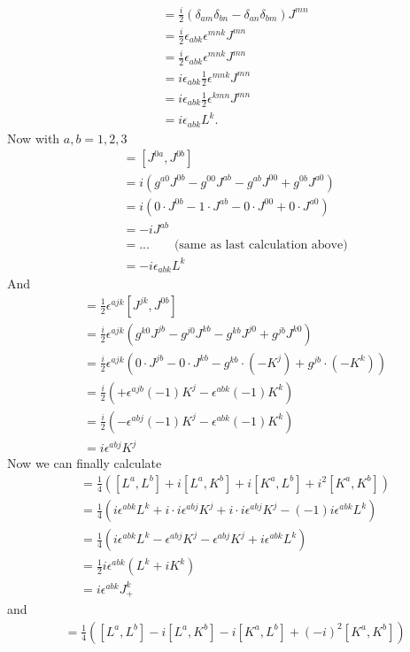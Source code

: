 \documentclass[../main.tex]{subfiles}
\begin{document}
\begin{enumerate}[(a)]
\begin{align}
&=\frac{i}{2}(\delta_{am}\delta_{bn}-\delta_{an}\delta_{bm})J^{mn}\\
&=\frac{i}{2}\epsilon_{abk}\epsilon^{mnk}J^{mn}\\
&=\frac{i}{2}\epsilon_{abk}\epsilon^{mnk}J^{mn}\\
&=i\epsilon_{abk}\frac{1}{2}\epsilon^{mnk}J^{mn}\\
&=i\epsilon_{abk}\frac{1}{2}\epsilon^{kmn}J^{mn}\\
&=i\epsilon_{abk}L^k.
\end{align}
Now with $a,b=1,2,3$
\begin{align}
[K^a,K^b]
&=[J^{0a},J^{0b}]\\
&=i(g^{a0}J^{0b}-g^{00}J^{ab}-g^{ab}J^{00}+g^{0b}J^{a0})\\
&=i(0\cdot J^{0b}-1\cdot J^{ab}-0\cdot J^{00}+0\cdot J^{a0})\\
&=-iJ^{ab}\\
&=...\qquad\text{(same as last calculation above)}\\
&=-i\epsilon_{abk}L^k
\end{align}
And
\begin{align}
[L^a,K^b]
&=\frac{1}{2}\epsilon^{ajk}[J^{jk},J^{0b}]\\
&=\frac{i}{2}\epsilon^{ajk}(g^{k0}J^{jb}-g^{j0}J^{kb}-g^{kb}J^{j0}+g^{jb}J^{k0})\\
&=\frac{i}{2}\epsilon^{ajk}\left(0\cdot J^{jb}-0\cdot J^{kb}-g^{kb}\cdot(-K^j)+g^{jb}\cdot(-K^k)\right)\\
&=\frac{i}{2}\left(+\epsilon^{ajb}(-1)K^j-\epsilon^{abk}(-1)K^k\right)\\
&=\frac{i}{2}\left(-\epsilon^{abj}(-1)K^j-\epsilon^{abk}(-1)K^k\right)\\
&=i\epsilon^{abj}K^j
\end{align}
Now we can finally calculate 
\begin{align}
[J_+^a,J_+^b]&=\frac{1}{4}\left([L^a,L^b]+i[L^a,K^b]+i[K^a,L^b]+i^2[K^a,K^b]\right)\\
&=\frac{1}{4}\left(i\epsilon^{abk}L^k+i\cdot i\epsilon^{abj}K^j+i\cdot i\epsilon^{abj}K^j-(-1)i\epsilon^{abk}L^k\right)\\
&=\frac{1}{4}\left(i\epsilon^{abk}L^k-\epsilon^{abj}K^j-\epsilon^{abj}K^j+i\epsilon^{abk}L^k\right)\\
&=\frac{1}{2}i\epsilon^{abk}(L^k+iK^k)\\
&=i\epsilon^{abk}J_+^k
\end{align}
and
\begin{align}
[J_-^a,J_-^b]&=\frac{1}{4}\left([L^a,L^b]-i[L^a,K^b]-i[K^a,L^b]+(-i)^2[K^a,K^b]\right)\\

\end{align}
\end{enumerate}
\end{document}
